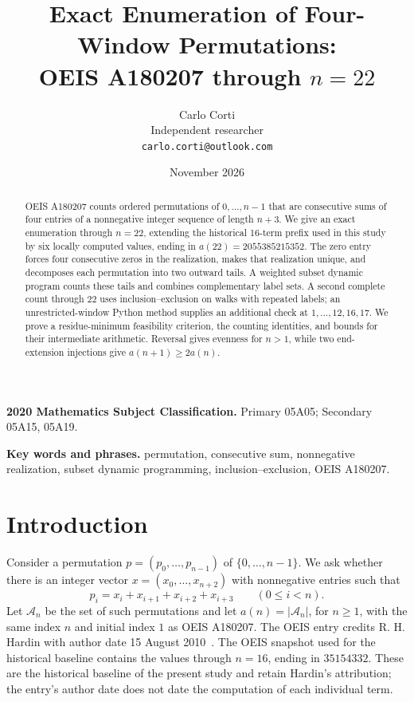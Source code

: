 \documentclass[11pt]{article}
\title{Exact Enumeration of Four-Window Permutations:\\OEIS A180207 through $n=22$}
\author{Carlo Corti\\Independent researcher\\\texttt{carlo.corti@outlook.com}}
\date{November 2026}
\theoremstyle{definition}
\theoremstyle{remark}
\newcommand{\calA}{\mathcal A}
\begin{document}
\maketitle

\begin{abstract}
OEIS A180207 counts ordered permutations of $0,\ldots,n-1$ that are
consecutive sums of four entries of a nonnegative integer sequence of length
$n+3$. We give an exact enumeration through $n=22$, extending the historical
16-term prefix used in this study by six locally computed values, ending in
$a(22)=2055385215352$. The zero entry forces four consecutive zeros in the
realization, makes that realization unique, and decomposes each permutation
into two outward tails. A weighted subset dynamic program counts these tails
and combines complementary label sets. A second complete count through $22$
uses inclusion--exclusion on walks with repeated labels; an unrestricted-window
Python method supplies an additional check at $1,\ldots,12,16,17$.
We prove a residue-minimum feasibility criterion, the counting identities,
and bounds for their intermediate arithmetic. Reversal gives evenness for
$n>1$, while two end-extension injections give $a(n+1)\geq2a(n)$.
\end{abstract}

\noindent\textbf{2020 Mathematics Subject Classification.}
Primary 05A05; Secondary 05A15, 05A19.

\smallskip
\noindent\textbf{Key words and phrases.}
permutation, consecutive sum, nonnegative realization, subset dynamic
programming, inclusion--exclusion, OEIS A180207.

\section{Introduction}
\label{sec:intro}

Consider a permutation $p=(p_0,\ldots,p_{n-1})$ of $\{0,\ldots,n-1\}$.
We ask whether there is an integer vector $x=(x_0,\ldots,x_{n+2})$ with
nonnegative entries such that
\begin{equation}
 p_i=x_i+x_{i+1}+x_{i+2}+x_{i+3}\qquad(0\leq i<n).
 \label{eq:windows}
\end{equation}
Let $\calA_n$ be the set of such permutations and let $a(n)=|\calA_n|$,
for $n\geq1$, with the same index $n$ and initial index $1$ as OEIS A180207.
The OEIS entry credits R. H. Hardin with author date
15 August 2010~\cite{hardin}. The OEIS snapshot used for the historical baseline
contains the values through $n=16$, ending in $35154332$. These are the
historical baseline of the present study and retain Hardin's attribution;
the entry's author date does not date the computation of each individual term.
\end{document}
